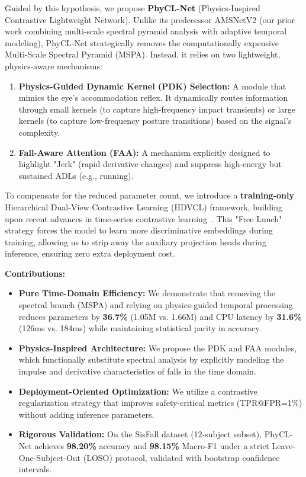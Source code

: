 \documentclass{article}
\begin{document}
Guided by this hypothesis, we propose \textbf{PhyCL-Net} (Physics-Inspired Contrastive Lightweight Network). Unlike its predecessor AMSNetV2 (our prior work combining multi-scale spectral pyramid analysis with adaptive temporal modeling), PhyCL-Net strategically removes the computationally expensive Multi-Scale Spectral Pyramid (MSPA). Instead, it relies on two lightweight, physics-aware mechanisms:

\begin{enumerate}
\item \textbf{Physics-Guided Dynamic Kernel (PDK) Selection:} A module that mimics the eye's accommodation reflex. It dynamically routes information through small kernels (to capture high-frequency impact transients) or large kernels (to capture low-frequency posture transitions) based on the signal's complexity.
\item \textbf{Fall-Aware Attention (FAA):} A mechanism explicitly designed to highlight "Jerk" (rapid derivative changes) and suppress high-energy but sustained ADLs (e.g., running).
\end{enumerate}

To compensate for the reduced parameter count, we introduce a \textbf{training-only} Hierarchical Dual-View Contrastive Learning (HDVCL) framework, building upon recent advances in time-series contrastive learning~\cite{Eldele2021TSTCC,Zhang2022TFC,Zheng2023SimTS}. This "Free Lunch" strategy forces the model to learn more discriminative embeddings during training, allowing us to strip away the auxiliary projection heads during inference, ensuring zero extra deployment cost.

\textbf{Contributions:}
\begin{itemize}
\item \textbf{Pure Time-Domain Efficiency:} We demonstrate that removing the spectral branch (MSPA) and relying on physics-guided temporal processing reduces parameters by \textbf{36.7\%} (1.05M vs. 1.66M) and CPU latency by \textbf{31.6\%} (126ms vs. 184ms) while maintaining statistical parity in accuracy.
\item \textbf{Physics-Inspired Architecture:} We propose the PDK and FAA modules, which functionally substitute spectral analysis by explicitly modeling the impulse and derivative characteristics of falls in the time domain.
\item \textbf{Deployment-Oriented Optimization:} We utilize a contrastive regularization strategy that improves safety-critical metrics (TPR@FPR=1\%) without adding inference parameters.
\item \textbf{Rigorous Validation:} On the SisFall dataset (12-subject subset), PhyCL-Net achieves \textbf{98.20\%} accuracy and \textbf{98.15\%} Macro-F1 under a strict Leave-One-Subject-Out (LOSO) protocol, validated with bootstrap confidence intervals.
\end{itemize}
\end{document}
